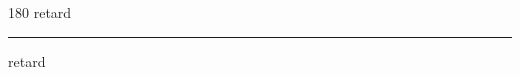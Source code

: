 
\begin{frame}
\begin{center}
\begin{turn}{180}
{\fontsize{2.5cm}{1em}\selectfont retard}
\end{turn}
\vspace{1em}\par  
\hrule
\vspace{1em}\par  
{\fontsize{2.5cm}{1em}\selectfont retard}
\end{center}
\end{frame}
